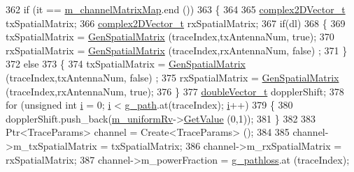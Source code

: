 \begin{DoxyCode}
362         \textcolor{keywordflow}{if} (it == \hyperlink{classns3_1_1MmWaveChannelRaytracing_abdee4d8795a80d738563c52ec233cfdd}{m\_channelMatrixMap}.end ())
363         \{
364 
365                 \hyperlink{namespacens3_aa25e3feece2676fd7470d50d4ba3d1d1}{complex2DVector\_t} txSpatialMatrix;
366                 \hyperlink{namespacens3_aa25e3feece2676fd7470d50d4ba3d1d1}{complex2DVector\_t} rxSpatialMatrix;
367                 \textcolor{keywordflow}{if}(dl)
368                 \{
369                         txSpatialMatrix = \hyperlink{classns3_1_1MmWaveChannelRaytracing_a49dc87b1c7a9e87b2dfc0f64dbe3e543}{GenSpatialMatrix} (traceIndex,txAntennaNum, \textcolor{keyword}{true});
370                         rxSpatialMatrix = \hyperlink{classns3_1_1MmWaveChannelRaytracing_a49dc87b1c7a9e87b2dfc0f64dbe3e543}{GenSpatialMatrix} (traceIndex,rxAntennaNum, \textcolor{keyword}{false})
      ;
371                 \}
372                 \textcolor{keywordflow}{else}
373                 \{
374                         txSpatialMatrix = \hyperlink{classns3_1_1MmWaveChannelRaytracing_a49dc87b1c7a9e87b2dfc0f64dbe3e543}{GenSpatialMatrix} (traceIndex,txAntennaNum, \textcolor{keyword}{false})
      ;
375                         rxSpatialMatrix = \hyperlink{classns3_1_1MmWaveChannelRaytracing_a49dc87b1c7a9e87b2dfc0f64dbe3e543}{GenSpatialMatrix} (traceIndex,rxAntennaNum, \textcolor{keyword}{true});
376                 \}
377                 \hyperlink{namespacens3_aa6f1edf6566ca6afec613bc6e40240ea}{doubleVector\_t} dopplerShift;
378                 \textcolor{keywordflow}{for} (\textcolor{keywordtype}{unsigned} \textcolor{keywordtype}{int} \hyperlink{bernuolliDistribution_8m_a6f6ccfcf58b31cb6412107d9d5281426}{i} = 0; \hyperlink{bernuolliDistribution_8m_a6f6ccfcf58b31cb6412107d9d5281426}{i} < \hyperlink{namespacens3_aa9bd92de8f4cfc681e22ff5b45e141c6}{g\_path}.at(traceIndex); \hyperlink{bernuolliDistribution_8m_a6f6ccfcf58b31cb6412107d9d5281426}{i}++)
379                 \{
380                         dopplerShift.push\_back(\hyperlink{classns3_1_1MmWaveChannelRaytracing_a13ab4f0642dccc8758a20e0418cd7b16}{m\_uniformRv}->\hyperlink{classns3_1_1UniformRandomVariable_a03822d8c86ac51e9aa83bbc73041386b}{GetValue} (0,1));
381                 \}
382 
383                 Ptr<TraceParams> channel = Create<TraceParams> ();
384 
385                 channel->m\_txSpatialMatrix = txSpatialMatrix;
386                 channel->m\_rxSpatialMatrix = rxSpatialMatrix;
387                 channel->m\_powerFraction = \hyperlink{namespacens3_a7393b978973ee32cbf20a99c193f3aa7}{g\_pathloss}.at (traceIndex);

\end{DoxyCode}
